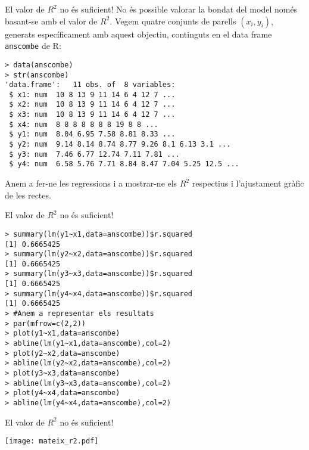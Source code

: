 \documentclass[12pt,t]{beamer}
\theoremstyle{plain}
\theoremstyle{definition}
\begin{document}
\begin{frame}[fragile]{El valor de $R^2$ no és suficient!}
No és possible valorar la bondat del model només basant-se amb el valor de $R^2$. Vegem quatre conjunts de parells $(x_i,y_i)$, generats específicament amb aquest objectiu, continguts en el data frame \texttt{anscombe} de R:

\begin{footnotesize}

\begin{verbatim}
> data(anscombe)
> str(anscombe)
'data.frame':	11 obs. of  8 variables:
 $ x1: num  10 8 13 9 11 14 6 4 12 7 ...
 $ x2: num  10 8 13 9 11 14 6 4 12 7 ...
 $ x3: num  10 8 13 9 11 14 6 4 12 7 ...
 $ x4: num  8 8 8 8 8 8 8 19 8 8 ...
 $ y1: num  8.04 6.95 7.58 8.81 8.33 ...
 $ y2: num  9.14 8.14 8.74 8.77 9.26 8.1 6.13 3.1 ...
 $ y3: num  7.46 6.77 12.74 7.11 7.81 ...
 $ y4: num  6.58 5.76 7.71 8.84 8.47 7.04 5.25 12.5 ...
\end{verbatim}

\end{footnotesize}
Anem a fer-ne les regressions i a mostrar-ne els $R^2$ respectius i l'ajustament gràfic de les rectes.

\end{frame}

\begin{frame}[fragile]{El valor de $R^2$ no és suficient!}
\begin{footnotesize}
\begin{verbatim}
> summary(lm(y1~x1,data=anscombe))$r.squared
[1] 0.6665425
> summary(lm(y2~x2,data=anscombe))$r.squared
[1] 0.6665425
> summary(lm(y3~x3,data=anscombe))$r.squared
[1] 0.6665425
> summary(lm(y4~x4,data=anscombe))$r.squared
[1] 0.6665425
> #Anem a representar els resultats
> par(mfrow=c(2,2))
> plot(y1~x1,data=anscombe)
> abline(lm(y1~x1,data=anscombe),col=2)
> plot(y2~x2,data=anscombe)
> abline(lm(y2~x2,data=anscombe),col=2)
> plot(y3~x3,data=anscombe)
> abline(lm(y3~x3,data=anscombe),col=2)
> plot(y4~x4,data=anscombe)
> abline(lm(y4~x4,data=anscombe),col=2)

\end{verbatim}
\end{footnotesize}
\end{frame}

\begin{frame}{El valor de $R^2$ no és suficient!}

\begin{center}
\texttt{[image: mateix\_r2.pdf]}
\end{center}

\end{frame}
\end{document}
